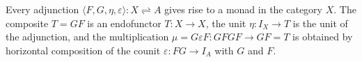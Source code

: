 Every adjunction $\langle F, G, \eta, \varepsilon \rangle: X \rightleftharpoons A$ gives rise to a monad in the category $X$. The composite $T = GF$ is an endofunctor $T: X \to X$, the unit $\eta: I_X \to T$ is the unit of the adjunction, and the multiplication $\mu = G\varepsilon F: GFGF \to GF = T$ is obtained by horizontal composition of the counit $\varepsilon: FG \to I_A$ with $G$ and $F$.
